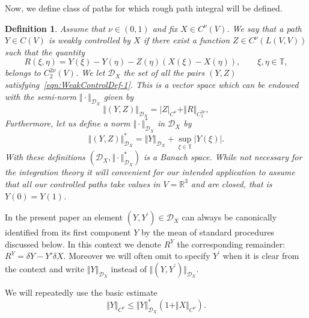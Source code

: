 \documentclass[11pt,a4paper,reqno]{amsart}%
\theoremstyle{plain}
\theoremstyle{remark}
\theoremstyle{plain}
\newtheorem{definition}[theorem]{Definition}
\numberwithin{equation}{section}
\def\Rnu{{\mathbb R}}
\begin{document}
Now, we define class of paths for which rough path integral will
be defined.
\begin{definition} Assume that $\nu \in (0,1)$ and  fix $X\in C^{\nu}(V)$. %
We say that a path $Y\in C(V)$ is weakly controlled by $X$ if
there exist a function $Z\in C^{\nu}(L(V,V))$ such that the quantity
\begin{equation}
R(\xi,\eta) = Y(\xi)-Y(\eta) - Z(\eta)(X(\xi)-X(\eta)) ,\qquad\xi,\eta\in
\mathbb{T}, \label{eqn:WeakControlDef-1}
\end{equation}
belongs to $C_2^{2\nu}(V)$. We let $\mathcal{D}_X$ the set of all the pairs $(Y,Z)$ satisfying~\eqref{eqn:WeakControlDef-1}. This is a vector space which can be endowed with the semi-norm $\Vert \cdot\Vert_{\mathcal{D}_X}$  given by
\begin{equation}
\Vert (Y,Z)\Vert_{\mathcal{D}_X}=\vert Z\vert_{C^{\nu}}+\Vert R\Vert_{C_2^{2\nu}},\label{eqn:D_XNorm-1}
\end{equation}
Furthermore, let us define a  norm $\Vert \cdot\Vert_{\mathcal{D}_X}^\ast$  in
$\mathcal{D}_X$ by 
\begin{equation}
\Vert (Y,Z)\Vert_{\mathcal{D}_X}^\ast=\Vert Y\Vert_{\mathcal{D}_X}+\sup_{\xi\in \mathbb{T}} |Y(\xi)|. \label{eqn:D_XNorm-2}
\end{equation}
With these definitions
$(\mathcal{D}_X,\Vert \cdot\Vert_{\mathcal{D}_X}^\ast)$ is a Banach space. While not necessary for the integration theory it will convenient for our intended application to assume that all our controlled paths take values in  $V=\mathbb{R}^3$ and are closed, that is $Y(0)=Y(1)$. 
\end{definition}

In the present paper an element $(Y,Y^\prime)\in \mathcal{D}_X$ can always be canonically identified from its first component $Y$ by the mean of standard procedures discussed below. In this context we denote $R^Y$ the corresponding remainder: $R^Y = \delta Y - Y' \delta X$. Moreover we will often
omit to specify $Y^\prime$ when it is clear from the context and write
$\Vert Y\Vert_{\mathcal{D}_X}$ instead of $\Vert (Y,Y^\prime)\Vert_{\mathcal{D}_X}$.

We will repeatedly use the basic estimate
\begin{equation}
\Vert Y\Vert_{C^{\nu}}\leq
\Vert Y\Vert_{\mathcal{D}_X}^*(1+\Vert X\Vert_{C^{\nu}}).\label{eqn:HolderIneq}
\end{equation}
\end{document}
